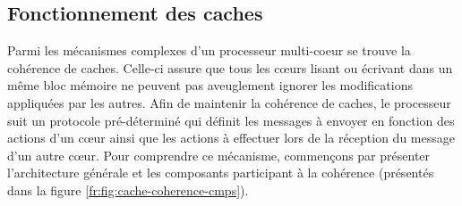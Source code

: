 \begin{description}
         \automataenvironment{}
      \rangle{}
      \models
      \agop{}~\phi \triangleq
   $]~~\\
      Pour tous les chemins partant de
         $\langle
            \automatastate{},
            \automataenvironment{}
         \rangle$,
         tous les
         $\langle
            \automatastate{}',
            \automataenvironment{}'
         \rangle$
         du chemin vérifient
         $\langle
            \automatastate{}',
            \automataenvironment{}'
         \rangle{}
         \models~\phi
         $
\item[%
   $
      \langle
         \automatastate{},
         \automataenvironment{}
      \rangle{}
      \models
      \egop{}~\phi \triangleq
   $]~~\\
      Il y a un chemin partant de
         $\langle
            \automatastate{},
            \automataenvironment{}
         \rangle$ tel que tous les
         $\langle
            \automatastate{}',
            \automataenvironment{}'
         \rangle$
         du chemin vérifient
         $\langle
            \automatastate{}',
            \automataenvironment{}'
         \rangle{}
         \models~\phi
         $
\item[%
   $
      \langle
         \automatastate{},
         \automataenvironment{}
      \rangle{}
      \models
      \leadstoop{\phi}{\psi} \triangleq
   $]~~\\
      Pour tous les chemins partant de
         $\langle
            \automatastate{},
            \automataenvironment{}
         \rangle$,
         tout sous-chemin partant d'un
         $\langle
            \automatastate{}',
            \automataenvironment{}'
         \rangle$
         tel que
         $
         \automataenvironment{}'
         \models_{PL} \phi
         $
         contient aussi au moins un
         $\langle
            \automatastate{}'',
            \automataenvironment{}''
         \rangle$
         tel que
         $
         \automataenvironment{}''
         \models_{PL} \psi
         $.
\end{description}


\subsection{Fonctionnement des caches}
\label{fr:sec:cache_coherence}
Parmi les mécanismes complexes d'un processeur multi-coeur se trouve la cohérence de caches. Celle-ci assure que tous les
c\oe urs lisant ou écrivant dans un même bloc mémoire ne peuvent pas
aveuglement ignorer les modifications appliquées par les autres.
Afin de maintenir la cohérence de caches, le processeur suit un protocole pré-déterminé qui définit
les messages à envoyer en fonction des actions d'un c\oe ur ainsi que les actions
à effectuer lors de la réception du message d'un autre c\oe ur.
Pour comprendre ce mécanisme, commençons par présenter l'architecture générale et les composants participant à la cohérence
(présentés dans la figure \ref{fr:fig:cache-coherence-cmps}).


